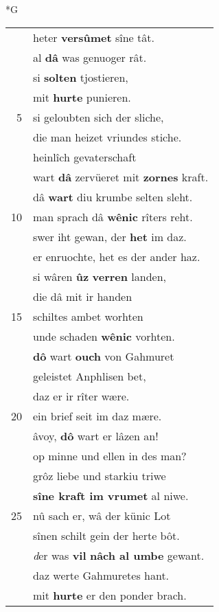 \documentclass[8pt,a4paper,notitlepage]{article}
\begin{document}
\newpage
\begin{table}[ht]
\begin{minipage}[t]{0.5\linewidth}
\small
\begin{center}*G
\end{center}
\begin{tabular}{rl}
 & heter \textbf{versûmet} sîne tât.\\ 
 & al \textbf{dâ} was genuoger rât.\\ 
 & si \textbf{solten} tjostieren,\\ 
 & mit \textbf{hurte} punieren.\\ 
5 & si geloubten sich der sliche,\\ 
 & die man heizet vriundes stiche.\\ 
 & heinlîch gevaterschaft\\ 
 & wart \textbf{dâ} zervüeret mit \textbf{zornes} kraft.\\ 
 & dâ \textbf{wart} diu krumbe selten sleht.\\ 
10 & man sprach dâ \textbf{wênic} rîters reht.\\ 
 & swer iht gewan, der \textbf{het} im daz.\\ 
 & er enruochte, het es der ander haz.\\ 
 & si wâren \textbf{ûz} \textbf{verren} landen,\\ 
 & die dâ mit ir handen\\ 
15 & schiltes ambet worhten\\ 
 & unde schaden \textbf{wênic} vorhten.\\ 
 & \textbf{dô} wart \textbf{ouch} von Gahmuret\\ 
 & geleistet Anphlisen bet,\\ 
 & daz er ir rîter wære.\\ 
20 & ein brief seit im daz mære.\\ 
 & âvoy, \textbf{dô} wart er lâzen an!\\ 
 & op minne und ellen in des man?\\ 
 & grôz liebe und starkiu triwe\\ 
 & \textbf{sîne kraft im vrumet} al niwe.\\ 
25 & nû sach er, wâ der künic Lot\\ 
 & sînen schilt gein der herte bôt.\\ 
 & \textit{d}er was \textbf{vil} \textbf{nâch al umbe} gewant.\\ 
 & daz werte Gahmuretes hant.\\ 
 & mit \textbf{hurte} er den ponder brach.\\ 

\end{tabular}
\end{minipage}
\end{table}
\end{document}
